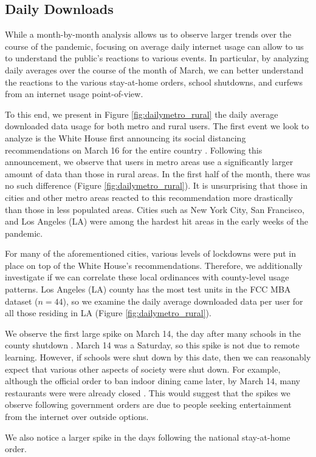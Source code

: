 \subsection{Daily Downloads}

While a month-by-month analysis allows us to observe larger trends over the course of the pandemic, focusing on average daily internet usage can allow to us to understand the public's reactions to various events. In particular, by analyzing daily averages over the course of the month of March, we can better understand the reactions to the various stay-at-home orders, school shutdowns, and curfews from an internet usage point-of-view. 

To this end, we present in Figure \ref{fig:dailymetro_rural} the daily average downloaded data usage for both metro and rural users. The first event we look to analyze is the White House first announcing its social distancing recommendations on March 16 for the entire country \cite{trump2020coronavirus}. Following this announcement, we observe that users in metro areas use a significantly larger amount of data than those in rural areas. In the first half of the month, there was no such difference (Figure \ref{fig:dailymetro_rural}). It is unsurprising that those in cities and other metro areas reacted to this recommendation more drastically than those in less populated areas. Cities such as New York City, San Francisco, and Los Angeles (LA) were among the hardest hit areas in the early weeks of the pandemic. 

For many of the aforementioned cities, various levels of lockdowns were put in place on top of the White House's recommendations. Therefore, we additionally investigate if we can correlate these local ordinances with county-level usage patterns. Los Angeles (LA) county has the most test units in the FCC MBA dataset ($n=44$), so we examine the daily average downloaded data per user for all those residing in LA (Figure \ref{fig:dailymetro_rural}). 

We observe the first large spike on March 14, the day after many schools in the county shutdown \cite{haire2020LA}. March 14 was a Saturday, so this spike is not due to remote learning. However, if schools were shut down by this date, then we can reasonably expect that various other aspects of society were shut down. For example, although the official order to ban indoor dining came later, by March 14, many restaurants were were already closed \cite{eater2020}. This would suggest that the spikes we observe following government orders are due to people seeking entertainment from the internet over outside options.

We also notice a larger spike in the days following the national stay-at-home order. 
